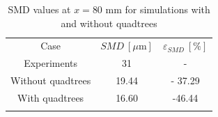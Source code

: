 \begin{table}[!h]
\centering
\caption{SMD values at $x = 80$ mm for simulations with and without quadtrees}
\begin{tabular}{ccc}
\thickhline
Case & $SMD~\left[\mu \mathrm{m} \right]$ & $\varepsilon_{SMD}~\left[\% \right]$ \\
\thickhline
Experiments & 31 & - \\
Without quadtrees & 19.44 & - 37.29 \\
With quadtrees & 16.60 & -46.44 \\
\thickhline
\end{tabular}
\label{tab:SMD_deviations_quadtrees}
\end{table}


\clearpage



